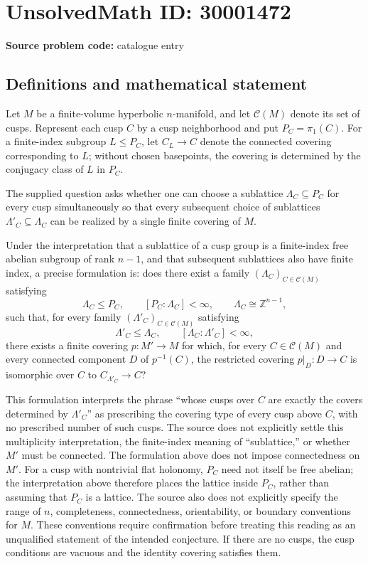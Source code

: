 \documentclass[11pt]{article}
\begin{document}
\section*{UnsolvedMath ID: 30001472}
\textbf{Source problem code:} catalogue entry
\subsection{Definitions and mathematical statement}
Let \(M\) be a finite-volume hyperbolic \(n\)-manifold, and let \(\mathcal C(M)\) denote its set of cusps. Represent each cusp \(C\) by a cusp neighborhood and put \(P_C=\pi_1(C)\). For a finite-index subgroup \(L\leq P_C\), let \(C_L\to C\) denote the connected covering corresponding to \(L\); without chosen basepoints, the covering is determined by the conjugacy class of \(L\) in \(P_C\).

The supplied question asks whether one can choose a sublattice \(\Lambda_C\subseteq P_C\) for every cusp simultaneously so that every subsequent choice of sublattices \(\Lambda'_C\subseteq\Lambda_C\) can be realized by a single finite covering of \(M\).

Under the interpretation that a sublattice of a cusp group is a finite-index free abelian subgroup of rank \(n-1\), and that subsequent sublattices also have finite index, a precise formulation is: does there exist a family \((\Lambda_C)_{C\in\mathcal C(M)}\) satisfying
\[
\Lambda_C\leq P_C,\qquad [P_C:\Lambda_C]<\infty,\qquad \Lambda_C\cong\mathbb Z^{n-1},
\]
such that, for every family \((\Lambda'_C)_{C\in\mathcal C(M)}\) satisfying
\[
\Lambda'_C\leq\Lambda_C,\qquad [\Lambda_C:\Lambda'_C]<\infty,
\]
there exists a finite covering \(p:M'\to M\) for which, for every \(C\in\mathcal C(M)\) and every connected component \(D\) of \(p^{-1}(C)\), the restricted covering \(p|_D:D\to C\) is isomorphic over \(C\) to \(C_{\Lambda'_C}\to C\)?

This formulation interprets the phrase ``whose cusps over \(C\) are exactly the covers determined by \(\Lambda'_C\)'' as prescribing the covering type of every cusp above \(C\), with no prescribed number of such cusps. The source does not explicitly settle this multiplicity interpretation, the finite-index meaning of ``sublattice,'' or whether \(M'\) must be connected. The formulation above does not impose connectedness on \(M'\). For a cusp with nontrivial flat holonomy, \(P_C\) need not itself be free abelian; the interpretation above therefore places the lattice inside \(P_C\), rather than assuming that \(P_C\) is a lattice. The source also does not explicitly specify the range of \(n\), completeness, connectedness, orientability, or boundary conventions for \(M\). These conventions require confirmation before treating this reading as an unqualified statement of the intended conjecture. If there are no cusps, the cusp conditions are vacuous and the identity covering satisfies them.
\end{document}
